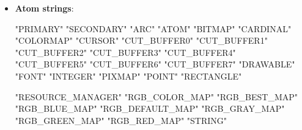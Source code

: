 \documentclass{report}
\begin{document}
\begin{itemize}
\begin{cppcode}
                XA_MAX_SPACE               45
                XA_END_SPACE               46
                XA_SUPERSCRIPT_X           47
                XA_SUPERSCRIPT_Y           48
                XA_SUBSCRIPT_X             49
                XA_SUBSCRIPT_Y             50
                XA_UNDERLINE_POSITION      51
                XA_UNDERLINE_THICKNESS     52
                XA_STRIKEOUT_ASCENT        53
                XA_STRIKEOUT_DESCENT       54
                XA_ITALIC_ANGLE            55
                XA_X_HEIGHT                56
            \end{cppcode}
            \bigbreak \noindent 
            \begin{cppcode}
                XA_QUAD_WIDTH              57
                XA_WEIGHT                  58
                XA_POINT_SIZE              59
                XA_RESOLUTION              60
                XA_COPYRIGHT               61
                XA_NOTICE                  62
                XA_FONT_NAME               63
                XA_FAMILY_NAME             64
                XA_FULL_NAME               65
                XA_CAP_HEIGHT              66
                XA_WM_CLASS                67
                XA_WM_TRANSIENT_FOR        68
                XA_LAST_PREDEFINED         68
            \end{cppcode}
        \item \textbf{Atom strings}:
            \bigbreak \noindent 
            \begin{cppcode}
                "PRIMARY"
                "SECONDARY"
                "ARC"
                "ATOM"
                "BITMAP"
                "CARDINAL"
                "COLORMAP"
                "CURSOR"
                "CUT_BUFFER0"
                "CUT_BUFFER1"
                "CUT_BUFFER2"
                "CUT_BUFFER3"
                "CUT_BUFFER4"
                "CUT_BUFFER5"
                "CUT_BUFFER6"
                "CUT_BUFFER7"
                "DRAWABLE"
                "FONT"
                "INTEGER"
                "PIXMAP"
                "POINT"
                "RECTANGLE"
            \end{cppcode}
            \bigbreak \noindent 
            \begin{cppcode}
                "RESOURCE_MANAGER"
                "RGB_COLOR_MAP"
                "RGB_BEST_MAP"
                "RGB_BLUE_MAP"
                "RGB_DEFAULT_MAP"
                "RGB_GRAY_MAP"
                "RGB_GREEN_MAP"
                "RGB_RED_MAP"
                "STRING"

\end{cppcode}
\end{itemize}
\end{document}
